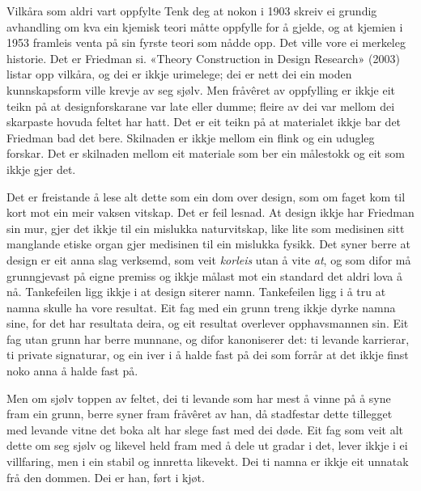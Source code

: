 \begin{kasus}{Vilkåra som aldri vart oppfylte}
Tenk deg at nokon i 1903 skreiv ei grundig avhandling om kva ein kjemisk teori måtte oppfylle for å gjelde, og at kjemien i 1953 framleis venta på sin fyrste teori som nådde opp. Det ville vore ei merkeleg historie. Det er Friedman si. «Theory Construction in Design Research» (2003) listar opp vilkåra, og dei er ikkje urimelege; dei er nett dei ein moden kunnskapsform ville krevje av seg sjølv. Men fråvêret av oppfylling er ikkje eit teikn på at designforskarane var late eller dumme; fleire av dei var mellom dei skarpaste hovuda feltet har hatt. Det er eit teikn på at materialet ikkje bar det Friedman bad det bere. Skilnaden er ikkje mellom ein flink og ein udugleg forskar. Det er skilnaden mellom eit materiale som ber ein målestokk og eit som ikkje gjer det.
\end{kasus}

Det er freistande å lese alt dette som ein dom over design, som om faget kom til kort mot ein meir vaksen vitskap. Det er feil lesnad. At design ikkje har Friedman sin mur, gjer det ikkje til ein mislukka naturvitskap, like lite som medisinen sitt manglande etiske organ gjer medisinen til ein mislukka fysikk. Det syner berre at design er eit anna slag verksemd, som veit \emph{korleis} utan å vite \emph{at}, og som difor må grunngjevast på eigne premiss og ikkje målast mot ein standard det aldri lova å nå. Tankefeilen ligg ikkje i at design siterer namn. Tankefeilen ligg i å tru at namna skulle ha vore resultat. Eit fag med ein grunn treng ikkje dyrke namna sine, for det har resultata deira, og eit resultat overlever opphavsmannen sin. Eit fag utan grunn har berre munnane, og difor kanoniserer det: ti levande karrierar, ti private signaturar, og ein iver i å halde fast på dei som forrår at det ikkje finst noko anna å halde fast på.

\vignett

Men om sjølv toppen av feltet, dei ti levande som har mest å vinne på å syne fram ein grunn, berre syner fram fråvêret av han, då stadfestar dette tillegget med levande vitne det boka alt har slege fast med dei døde. Eit fag som veit alt dette om seg sjølv og likevel held fram med å dele ut gradar i det, lever ikkje i ei villfaring, men i ein stabil og innretta likevekt. Dei ti namna er ikkje eit unnatak frå den dommen. Dei er han, ført i kjøt.

